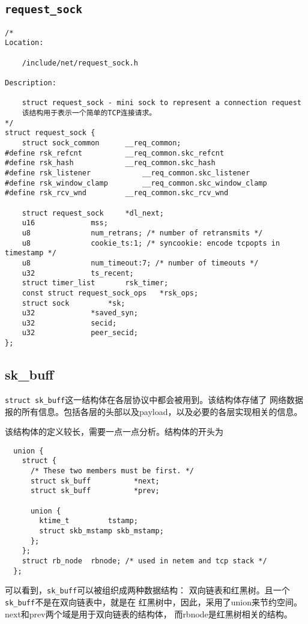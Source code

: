     \subsection{\texttt{request_sock}}

\begin{verbatim}
/* 
Location:

	/include/net/request_sock.h

Description:
	
	struct request_sock - mini sock to represent a connection request
	该结构用于表示一个简单的TCP连接请求。
*/
struct request_sock {
    struct sock_common      __req_common;
#define rsk_refcnt          __req_common.skc_refcnt
#define rsk_hash            __req_common.skc_hash
#define rsk_listener            __req_common.skc_listener
#define rsk_window_clamp        __req_common.skc_window_clamp
#define rsk_rcv_wnd         __req_common.skc_rcv_wnd

    struct request_sock     *dl_next;
    u16             mss;
    u8              num_retrans; /* number of retransmits */
    u8              cookie_ts:1; /* syncookie: encode tcpopts in timestamp */
    u8              num_timeout:7; /* number of timeouts */
    u32             ts_recent;
    struct timer_list       rsk_timer;
    const struct request_sock_ops   *rsk_ops;
    struct sock         *sk;
    u32             *saved_syn;
    u32             secid;
    u32             peer_secid;
};
\end{verbatim}

    \subsection{sk\_buff}
\label{sec:sk_buff}

\texttt{struct sk_buff}这一结构体在各层协议中都会被用到。该结构体存储了
网络数据报的所有信息。包括各层的头部以及payload，以及必要的各层实现相关的信息。

该结构体的定义较长，需要一点一点分析。结构体的开头为
\begin{verbatim}
  union {
    struct {
      /* These two members must be first. */
      struct sk_buff          *next;
      struct sk_buff          *prev;

      union {
        ktime_t         tstamp;
        struct skb_mstamp skb_mstamp;
      };
    };
    struct rb_node  rbnode; /* used in netem and tcp stack */
  };
\end{verbatim}

可以看到，\texttt{sk_buff}可以被组织成两种数据结构：
双向链表和红黑树。且一个\texttt{sk_buff}不是在双向链表中，就是在
红黑树中，因此，采用了union来节约空间。next和prev两个域是用于双向链表的结构体，
而rbnode是红黑树相关的结构。

